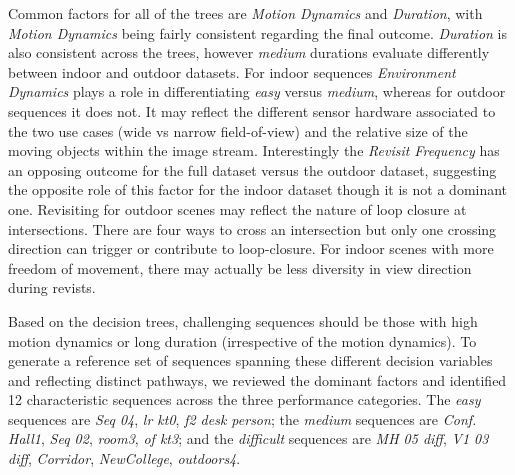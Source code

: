 Common factors for all of the trees are \textit{Motion Dynamics} and
\textit{Duration}, with \textit{Motion Dynamics} being fairly consistent
regarding the final outcome. \textit{Duration} is also consistent across
the trees, however \textit{medium} durations evaluate differently between
indoor and outdoor datasets.
For indoor sequences \textit{Environment Dynamics} plays a role in
differentiating \textit{easy} versus \textit{medium}, whereas for outdoor
sequences it does not. It may reflect the different sensor hardware
associated to the two use cases (wide vs narrow field-of-view) and the
relative size of the moving objects within the image stream.
Interestingly the \textit{Revisit Frequency} has an opposing outcome for the
full dataset versus the outdoor dataset, suggesting the opposite role
of this factor for the indoor dataset though it is not a dominant one.
Revisiting for outdoor scenes may reflect the nature of loop closure at
intersections. There are four ways to cross an intersection but only one
crossing direction can trigger or contribute to loop-closure. For indoor
scenes with more freedom of movement, there may actually be less diversity
in view direction during revists.



Based on the decision trees, challenging sequences should be those with high
motion dynamics or long duration (irrespective of the motion dynamics).
To generate a reference set of sequences spanning these different decision
variables and reflecting distinct pathways, we reviewed the dominant
factors and identified 12 characteristic sequences across the three
performance categories.  
The \textit{easy} sequences are \textit{Seq 04}, 
\textit{lr kt0}, 
\textit{f2 desk person};
the \textit{medium} sequences are 
\textit{Conf. Hall1}, 
\textit{Seq 02}, 
\textit{room3}, \textit{of kt3}; and the
\textit{difficult} sequences are \textit{MH 05 diff}, \textit{V1 03 diff}, 
\textit{Corridor}, \textit{NewCollege}, \textit{outdoors4}.

